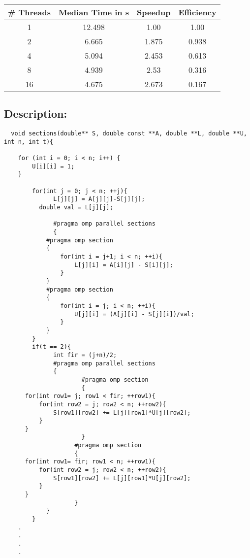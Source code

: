 \documentclass[12pt]{article}
\begin{document}
\begin{table}[H]
    \begin{center}
      \begin{tabular}{|c|c|c|c|} %
      \hline
      \textbf{\# Threads} & \textbf{Median Time in s} & \textbf{Speedup} & \textbf{Efficiency}\\
        \hline
        1 & 12.498 & 1.00 & 1.00\\  
        2 & 6.665 & 1.875 & 0.938\\
        4 & 5.094 & 2.453 & 0.613\\
        8 & 4.939 & 2.53 & 0.316\\
        16 & 4.675 & 2.673 & 0.167\\
        \hline
      \end{tabular}
    \end{center}
  \end{table}

\subsection*{Description:}

\begin{verbatim}
  void sections(double** S, double const **A, double **L, double **U, int n, int t){

    for (int i = 0; i < n; i++) {
        U[i][i] = 1;
    }

	    for(int j = 0; j < n; ++j){
		      L[j][j] = A[j][j]-S[j][j];
          double val = L[j][j];
          
		      #pragma omp parallel sections
		      {
            #pragma omp section
            {
                for(int i = j+1; i < n; ++i){
                    L[j][i] = A[i][j] - S[i][j];
                }
            }
            #pragma omp section
            {
                for(int i = j; i < n; ++i){
                    U[j][i] = (A[j][i] - S[j][i])/val;
                }
            }
		}
		if(t == 2){
			  int fir = (j+n)/2;
			  #pragma omp parallel sections
			  {
					  #pragma omp section
					  {
      for(int row1= j; row1 < fir; ++row1){
          for(int row2 = j; row2 < n; ++row2){
              S[row1][row2] += L[j][row1]*U[j][row2];
          }
      }
					  }
					#pragma omp section
					{
      for(int row1= fir; row1 < n; ++row1){
          for(int row2 = j; row2 < n; ++row2){
              S[row1][row2] += L[j][row1]*U[j][row2];
          }
      }
					}
			}
		}
    .
    .
    .
    .
\end{verbatim}
\end{document}
